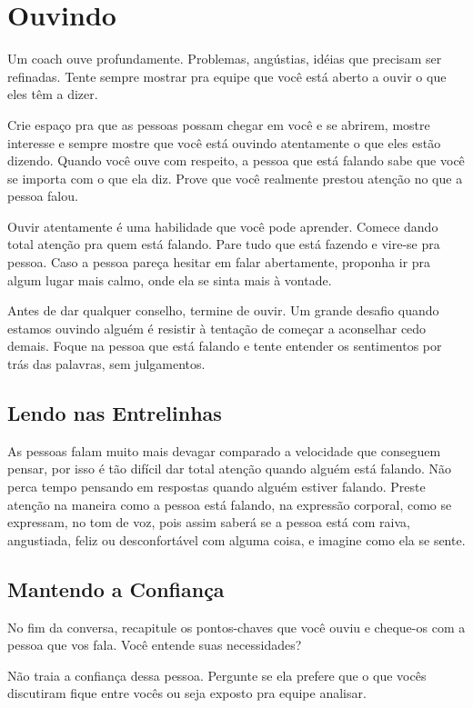 \documentclass[a4paper, 10pt, font=plain]{abnt}
\begin{document}
\section{Ouvindo}
Um coach ouve profundamente. Problemas, angústias, idéias que precisam ser refinadas. Tente sempre mostrar pra equipe que você está aberto a ouvir o que eles têm a dizer.

Crie espaço pra que as pessoas possam chegar em você e se abrirem, mostre interesse e sempre mostre que você está ouvindo atentamente o que eles estão dizendo. Quando você ouve com respeito, a pessoa que está falando sabe que você se importa com o que ela diz. Prove que você realmente prestou atenção no que a pessoa falou.

Ouvir atentamente é uma habilidade que você pode aprender. Comece dando total atenção pra quem está falando. Pare tudo que está fazendo e vire-se pra pessoa. Caso a pessoa pareça hesitar em falar abertamente, proponha ir pra algum lugar mais calmo, onde ela se sinta mais à vontade.

Antes de dar qualquer conselho, termine de ouvir. Um grande desafio quando estamos ouvindo alguém é resistir à tentação de começar a aconselhar cedo demais. Foque na pessoa que está falando e tente entender os sentimentos por trás das palavras, sem julgamentos.

\subsection{Lendo nas Entrelinhas}
As pessoas falam muito mais devagar comparado a velocidade que conseguem pensar, por isso é tão difícil dar total atenção quando alguém está falando. Não perca tempo pensando em respostas quando alguém estiver falando. Preste atenção na maneira como a pessoa está falando, na expressão corporal, como se expressam, no tom de voz, pois assim saberá se a pessoa está com raiva, angustiada, feliz ou desconfortável com alguma coisa, e imagine como ela se sente.

\subsection{Mantendo a Confiança}
No fim da conversa, recapitule os pontos-chaves que você ouviu e cheque-os com a pessoa que vos fala. Você entende suas necessidades?

Não traia a confiança dessa pessoa. Pergunte se ela prefere que o que vocês discutiram fique entre vocês ou seja exposto pra equipe analisar.
\end{document}

